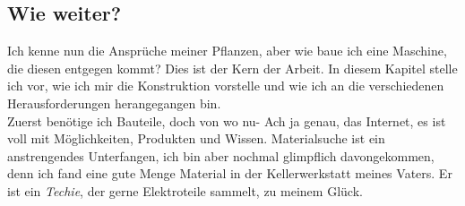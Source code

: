\documentclass[12pt,titlepage,a4paper]{article}
\begin{document}
\clearpage
\subsection{Wie weiter?}
Ich kenne nun die Ansprüche meiner Pflanzen, aber wie baue ich eine Maschine, die diesen entgegen kommt? Dies ist der Kern der Arbeit. In diesem Kapitel stelle ich vor, wie ich mir die Konstruktion vorstelle und wie ich an die verschiedenen Herausforderungen herangegangen bin.\\ Zuerst benötige ich Bauteile, doch von wo nu- Ach ja genau, das Internet, es ist voll mit Möglichkeiten, Produkten und Wissen.
Materialsuche ist ein anstrengendes Unterfangen, ich bin aber nochmal glimpflich davongekommen, denn ich fand  eine gute Menge Material in der Kellerwerkstatt meines Vaters. Er ist ein \textit{Techie}, der gerne Elektroteile sammelt, zu meinem Glück.
\end{document}

